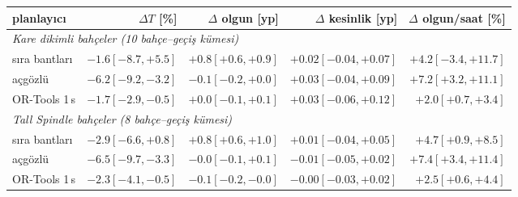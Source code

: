\begin{tabular}{lrrrr}
\toprule
planlayıcı & $\Delta T$ [\%] & $\Delta$ olgun [yp] & $\Delta$ kesinlik [yp] & $\Delta$ olgun/saat [\%] \\
\midrule
\multicolumn{5}{l}{\emph{Kare dikimli bahçeler (10 bahçe--geçiş kümesi)}} \\
sıra bantları & $-1.6 [-8.7,+5.5]$ & $+0.8 [+0.6,+0.9]$ & $+0.02 [-0.04,+0.07]$ & $+4.2 [-3.4,+11.7]$ \\
açgözlü & $-6.2 [-9.2,-3.2]$ & $-0.1 [-0.2,+0.0]$ & $+0.03 [-0.04,+0.09]$ & $+7.2 [+3.2,+11.1]$ \\
OR-Tools 1\,s & $-1.7 [-2.9,-0.5]$ & $+0.0 [-0.1,+0.1]$ & $+0.03 [-0.06,+0.12]$ & $+2.0 [+0.7,+3.4]$ \\
\midrule
\multicolumn{5}{l}{\emph{Tall Spindle bahçeler (8 bahçe--geçiş kümesi)}} \\
sıra bantları & $-2.9 [-6.6,+0.8]$ & $+0.8 [+0.6,+1.0]$ & $+0.01 [-0.04,+0.05]$ & $+4.7 [+0.9,+8.5]$ \\
açgözlü & $-6.5 [-9.7,-3.3]$ & $-0.0 [-0.1,+0.1]$ & $-0.01 [-0.05,+0.02]$ & $+7.4 [+3.4,+11.4]$ \\
OR-Tools 1\,s & $-2.3 [-4.1,-0.5]$ & $-0.1 [-0.2,-0.0]$ & $-0.00 [-0.03,+0.02]$ & $+2.5 [+0.6,+4.4]$ \\
\bottomrule
\end{tabular}
